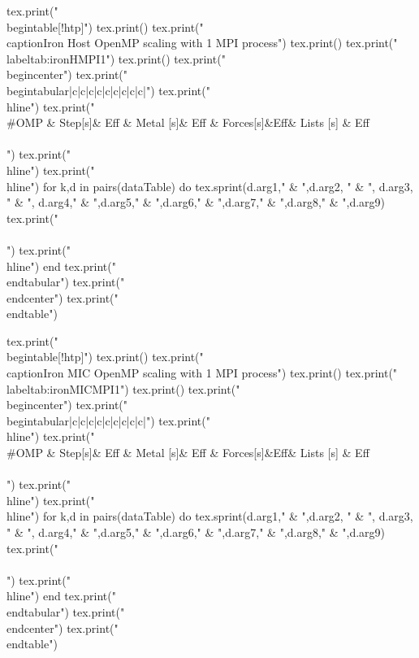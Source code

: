 %
%
\begin{luacode*}
  tex.print("\\begin{table}[!htp]")
  tex.print()
  tex.print("\\caption{Iron Host OpenMP scaling with 1 MPI process}")
  tex.print()
  tex.print("\\label{tab:ironHMPI1}")
  tex.print()
  tex.print("\\begin{center}")
  tex.print("\\begin{tabular}{|c|c|c|c|c|c|c|c|c|}")
  tex.print("\\hline")
  tex.print("\\#OMP & Step[s]& Eff & Metal [s]& Eff & Forces[s]&Eff& Lists [s] & Eff\\\\")
  tex.print("\\hline")
  tex.print("\\hline")
  for k,d in pairs(dataTable) do
    tex.sprint(d.arg1," & ",d.arg2, " & ", d.arg3, " & ", d.arg4," & ",d.arg5," & ",d.arg6," & ",d.arg7," & ",d.arg8," & ",d.arg9)
    tex.print(" \\\\")
    tex.print("\\hline")
  end
  tex.print("\\end{tabular}")
  tex.print("\\end{center}")
  tex.print("\\end{table}")
\end{luacode*}
\begin{luacode*}
  tex.print("\\begin{table}[!htp]")
  tex.print()
  tex.print("\\caption{Iron MIC OpenMP scaling with 1 MPI process}")
  tex.print()
  tex.print("\\label{tab:ironMICMPI1}")
  tex.print()
  tex.print("\\begin{center}")
  tex.print("\\begin{tabular}{|c|c|c|c|c|c|c|c|c|}")
  tex.print("\\hline")
  tex.print("\\#OMP & Step[s]& Eff & Metal [s]& Eff & Forces[s]&Eff& Lists [s] & Eff\\\\")
  tex.print("\\hline")
  tex.print("\\hline")
  for k,d in pairs(dataTable) do
    tex.sprint(d.arg1," & ",d.arg2, " & ", d.arg3, " & ", d.arg4," & ",d.arg5," & ",d.arg6," & ",d.arg7," & ",d.arg8," & ",d.arg9)
    tex.print(" \\\\")
    tex.print("\\hline")
  end
  tex.print("\\end{tabular}")
  tex.print("\\end{center}")
  tex.print("\\end{table}")
\end{luacode*}

